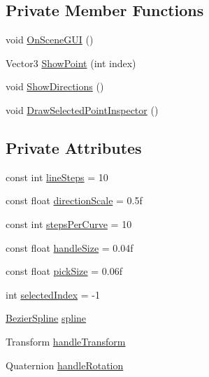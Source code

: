 \subsection*{Private Member Functions}
\begin{DoxyCompactItemize}
\item 
void \hyperlink{classBezierSplineInspector_a1b5db10b5a3a743cbd2895cc61faad23}{On\+Scene\+G\+UI} ()
\item 
Vector3 \hyperlink{classBezierSplineInspector_a413aaf08e6210a0613ec05ee97ca93dc}{Show\+Point} (int index)
\item 
void \hyperlink{classBezierSplineInspector_a1fab28bf9747a0e23dcae459f9d965b7}{Show\+Directions} ()
\item 
void \hyperlink{classBezierSplineInspector_a9301f0b079b6a96ff147231bb6af0bfe}{Draw\+Selected\+Point\+Inspector} ()
\end{DoxyCompactItemize}
\subsection*{Private Attributes}
\begin{DoxyCompactItemize}
\item 
const int \hyperlink{classBezierSplineInspector_a6cc82c82cb437fc3a75a5b2b8f6d5789}{line\+Steps} = 10
\item 
const float \hyperlink{classBezierSplineInspector_a574e20490bad6dbaf9024fa6cc6d4d24}{direction\+Scale} = 0.\+5f
\item 
const int \hyperlink{classBezierSplineInspector_a444eba3ff5695e7b87c042ad7e2ee0aa}{steps\+Per\+Curve} = 10
\item 
const float \hyperlink{classBezierSplineInspector_ac9749fa64c910242d064f1a6c924fa98}{handle\+Size} = 0.\+04f
\item 
const float \hyperlink{classBezierSplineInspector_acc93b6778c8674ec2b57d48a1466bcd6}{pick\+Size} = 0.\+06f
\item 
int \hyperlink{classBezierSplineInspector_af0b7882ca31e32db00b624a622f001d1}{selected\+Index} = -\/1
\item 
\hyperlink{classBezierSpline}{Bezier\+Spline} \hyperlink{classBezierSplineInspector_a13f1a0472f67bdf873d1e34d2ed5ff32}{spline}
\item 
Transform \hyperlink{classBezierSplineInspector_a735dfdff25b8fd3ea904c73584648667}{handle\+Transform}
\item 
Quaternion \hyperlink{classBezierSplineInspector_a6ba4d222ada9cfeeb4f36e2649c4f286}{handle\+Rotation}
\end{DoxyCompactItemize}
